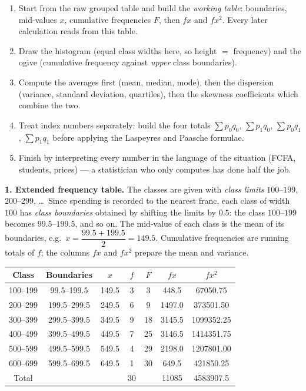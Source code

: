 \documentclass[11pt]{article}
\newcounter{popsec}
\newcounter{popsub}
\newcommand{\courssub}[1]{%
  \stepcounter{popsub}%
  \par\vspace{9pt}\noindent{\popxbold\fontsize{11.5}{13}\selectfont\color{popink}{\color{poporange}\thepopsec.\thepopsub}\hspace{6pt}#1}\par\nopagebreak\vspace{4pt}
}
\begin{document}
\begin{methode}
\begin{enumerate}
\item Start from the raw grouped table and build the \emph{working table}: boundaries, mid-values $x$, cumulative frequencies $F$, then $fx$ and $fx^2$. Every later calculation reads from this table.
\item Draw the histogram (equal class widths here, so height $=$ frequency) and the ogive (cumulative frequency against \emph{upper} class boundaries).
\item Compute the averages first (mean, median, mode), then the dispersion (variance, standard deviation, quartiles), then the skewness coefficients which combine the two.
\item Treat index numbers separately: build the four totals $\sum p_0q_0$, $\sum p_1q_0$, $\sum p_0q_1$, $\sum p_1q_1$ before applying the Laspeyres and Paasche formulae.
\item Finish by interpreting every number in the language of the situation (FCFA, students, prices) — a statistician who only computes has done half the job.
\end{enumerate}
\end{methode}

\courssub{Model answer}

\textbf{1. Extended frequency table.} The classes are given with \emph{class limits} $100$--$199$, $200$--$299$, \dots\ Since spending is recorded to the nearest franc, each class of width $100$ has \emph{class boundaries} obtained by shifting the limits by $0.5$: the class $100$--$199$ becomes $99.5$--$199.5$, and so on. The mid-value of each class is the mean of its boundaries, e.g.\ $x = \dfrac{99.5 + 199.5}{2} = 149.5$. Cumulative frequencies are running totals of $f$; the columns $fx$ and $fx^2$ prepare the mean and variance.

\begin{center}
\begin{tabular}{|c|c|c|c|c|c|c|}
\hline
\rowcolor{popblueL} Class & Boundaries & $x$ & $f$ & $F$ & $fx$ & $fx^2$ \\
\hline
100--199 & 99.5--199.5 & 149.5 & 3 & 3 & 448.5 & 67050.75 \\
\hline
200--299 & 199.5--299.5 & 249.5 & 6 & 9 & 1497.0 & 373501.50 \\
\hline
300--399 & 299.5--399.5 & 349.5 & 9 & 18 & 3145.5 & 1099352.25 \\
\hline
400--499 & 399.5--499.5 & 449.5 & 7 & 25 & 3146.5 & 1414351.75 \\
\hline
500--599 & 499.5--599.5 & 549.5 & 4 & 29 & 2198.0 & 1207801.00 \\
\hline
600--699 & 599.5--699.5 & 649.5 & 1 & 30 & 649.5 & 421850.25 \\
\hline
\rowcolor{popblueL} Total & & & 30 & & 11085 & 4583907.5 \\
\hline
\end{tabular}
\end{center}
\end{document}
